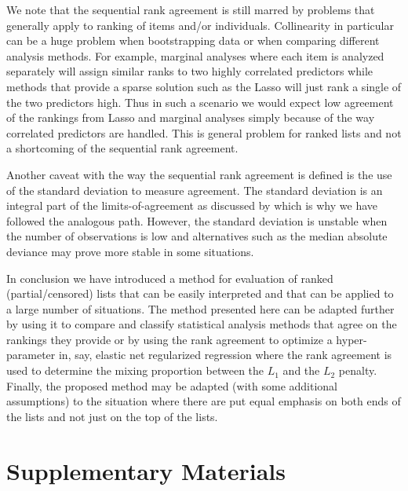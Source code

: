 \documentclass[oupdraft]{bio}
\newcommand{\added}[1]{{\color{added}{}#1}}
\begin{document}
We note that the sequential rank agreement is still marred by problems
that generally apply to ranking of items and/or
individuals. Collinearity in particular can be a huge problem when
bootstrapping data or when comparing different analysis methods. For
example, marginal analyses where each item is analyzed separately will
assign similar ranks to two highly correlated predictors while methods
that provide a sparse solution such as the Lasso will just rank a
single of the two predictors high.  Thus in such a scenario we would
expect low agreement of the rankings from Lasso and marginal analyses
simply because of the way correlated predictors are handled. This is
general problem for ranked lists and not a shortcoming of the
sequential rank agreement. %

Another caveat with the way the sequential rank agreement is defined
is the use of the standard deviation to measure agreement. The
standard deviation is an integral part of the limits-of-agreement as
discussed by \citet{alt:bland:1983} which is why we have followed the
analogous path. However, the standard deviation is unstable
when the number of observations is low and alternatives such
as the median absolute deviance may prove more stable in some
situations.

In conclusion we have introduced a method for evaluation of ranked
(partial/censored) lists that can be easily interpreted and that can
be applied to a large number of situations.  The method presented here
can be adapted further by using it to compare and classify statistical
analysis methods that agree on the rankings they provide or by using
the rank agreement to optimize a hyper-parameter in, say, elastic net
regularized regression where the rank agreement is used to determine
the mixing proportion between the $L_1$ and the $L_2$ penalty.
\added{Finally, the proposed method may be adapted (with some
  additional assumptions) to the situation where there are put equal
  emphasis on both ends of the lists and not just on the top of the
  lists.}

\section{Supplementary Materials}
\label{sec5}
\end{document}
